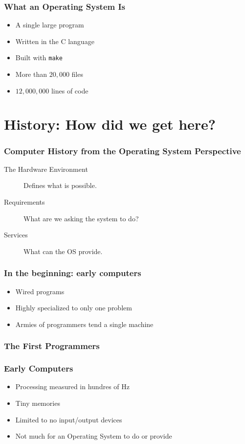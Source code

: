 \documentclass[pdftex]{beamer} %
\begin{document}
\begin{frame}[fragile]
  \frametitle{What an Operating System Is}
  \begin{itemize}
  \item A single large program
  \item Written in the C language
  \item Built with \texttt{make}
  \item More than $20,000$ files
  \item $12,000,000$ lines of code
  \end{itemize}
\end{frame}

\section{History: How did we get here?}

\begin{frame}
  \frametitle{Computer History from the Operating System Perspective}
  \begin{description}
  \item [The Hardware Environment] Defines what is possible.
  \item [Requirements] What are we asking the system to do?
  \item [Services] What can the OS provide.
  \end{description}
\end{frame}

\begin{frame}
  \frametitle{In the beginning: early computers}
  \begin{itemize}
  \item Wired programs
  \item Highly specialized to only one problem
  \item Armies of programmers tend a single machine
  \end{itemize}
\end{frame}

\begin{frame}
  \frametitle{The First Programmers}
  
\end{frame}

\begin{frame}
  \frametitle{Early Computers}
  \begin{itemize}
  \item Processing measured in hundres of Hz
  \item Tiny memories
  \item Limited to no input/output devices
  \item Not much for an Operating System to do or provide
  \end{itemize}
\end{frame}
\end{document}
